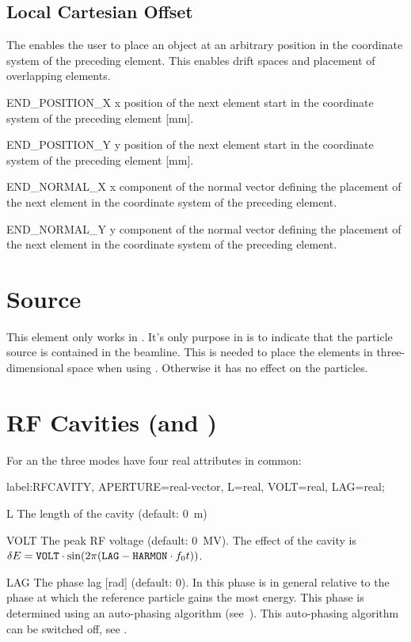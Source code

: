 \subsection{Local Cartesian Offset}
The  enables the user to place an object at an
arbitrary position in the coordinate system of the preceding element. This
enables drift spaces and placement of overlapping elements.
\begin{kdescription}
\item[END\_POSITION\_X] x position of the next element start in the
coordinate system of the preceding element [\si{\milli\meter}].
\item[END\_POSITION\_Y] y position of the next element start in the
coordinate system of the preceding element [\si{\milli\meter}].
\item[END\_NORMAL\_X] x component of the normal vector defining the placement of
the next element in the coordinate system of the preceding element.
\item[END\_NORMAL\_Y] y component of the normal vector defining the placement of
the next element in the coordinate system of the preceding element.
\end{kdescription}

\clearpage
\section{Source}
\label{sec:source}
This element only works in \opalt. It's only purpose in \opalt is to indicate that the particle source is contained in the beamline. This is needed to place the elements in three-dimensional space when using . Otherwise it has no effect on the particles.

\clearpage
\section{RF Cavities (\opalt and \opalcycl)}
\label{sec:cavity}
For an  the three modes have four real attributes in common:
\begin{example}
label:RFCAVITY, APERTURE=real-vector, L=real,
      VOLT=real, LAG=real;
\end{example}
\begin{kdescription}
\item[L]
  The length of the cavity (default: 0~m)
\item[VOLT]
  The peak RF voltage (default: 0~MV).
  The effect of the cavity is
  $\delta E=\text{\keyword{VOLT}}\cdot\sin(2\pi(\text{\keyword{LAG}}-\text{\keyword{HARMON}}\cdot f_0 t))$.
\item[LAG]
  The phase lag [\si{\radian}] (default: 0). In \opalt this phase is in general relative to the phase at which the reference particle gains the most energy. This phase is determined using an auto-phasing algorithm (see~). This auto-phasing algorithm can be switched off, see .
\end{kdescription}


